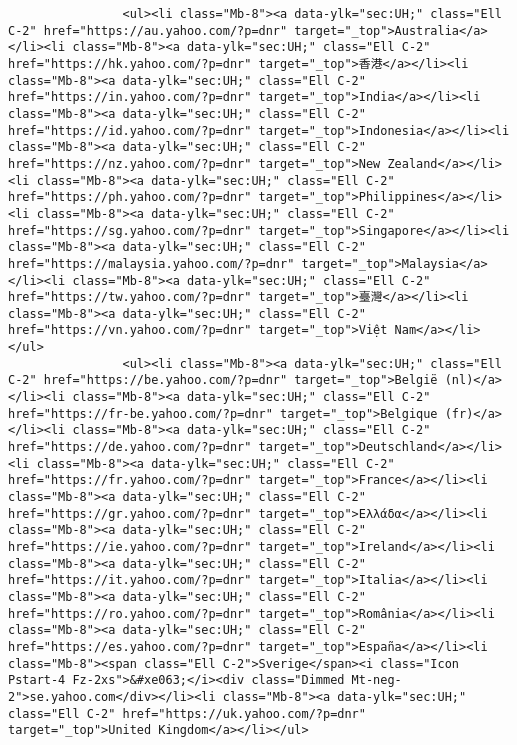 \begin{verbatim}
                <ul><li class="Mb-8"><a data-ylk="sec:UH;" class="Ell C-2" href="https://au.yahoo.com/?p=dnr" target="_top">Australia</a></li><li class="Mb-8"><a data-ylk="sec:UH;" class="Ell C-2" href="https://hk.yahoo.com/?p=dnr" target="_top">香港</a></li><li class="Mb-8"><a data-ylk="sec:UH;" class="Ell C-2" href="https://in.yahoo.com/?p=dnr" target="_top">India</a></li><li class="Mb-8"><a data-ylk="sec:UH;" class="Ell C-2" href="https://id.yahoo.com/?p=dnr" target="_top">Indonesia</a></li><li class="Mb-8"><a data-ylk="sec:UH;" class="Ell C-2" href="https://nz.yahoo.com/?p=dnr" target="_top">New Zealand</a></li><li class="Mb-8"><a data-ylk="sec:UH;" class="Ell C-2" href="https://ph.yahoo.com/?p=dnr" target="_top">Philippines</a></li><li class="Mb-8"><a data-ylk="sec:UH;" class="Ell C-2" href="https://sg.yahoo.com/?p=dnr" target="_top">Singapore</a></li><li class="Mb-8"><a data-ylk="sec:UH;" class="Ell C-2" href="https://malaysia.yahoo.com/?p=dnr" target="_top">Malaysia</a></li><li class="Mb-8"><a data-ylk="sec:UH;" class="Ell C-2" href="https://tw.yahoo.com/?p=dnr" target="_top">臺灣</a></li><li class="Mb-8"><a data-ylk="sec:UH;" class="Ell C-2" href="https://vn.yahoo.com/?p=dnr" target="_top">Việt Nam</a></li></ul>
                <ul><li class="Mb-8"><a data-ylk="sec:UH;" class="Ell C-2" href="https://be.yahoo.com/?p=dnr" target="_top">België (nl)</a></li><li class="Mb-8"><a data-ylk="sec:UH;" class="Ell C-2" href="https://fr-be.yahoo.com/?p=dnr" target="_top">Belgique (fr)</a></li><li class="Mb-8"><a data-ylk="sec:UH;" class="Ell C-2" href="https://de.yahoo.com/?p=dnr" target="_top">Deutschland</a></li><li class="Mb-8"><a data-ylk="sec:UH;" class="Ell C-2" href="https://fr.yahoo.com/?p=dnr" target="_top">France</a></li><li class="Mb-8"><a data-ylk="sec:UH;" class="Ell C-2" href="https://gr.yahoo.com/?p=dnr" target="_top">Ελλάδα</a></li><li class="Mb-8"><a data-ylk="sec:UH;" class="Ell C-2" href="https://ie.yahoo.com/?p=dnr" target="_top">Ireland</a></li><li class="Mb-8"><a data-ylk="sec:UH;" class="Ell C-2" href="https://it.yahoo.com/?p=dnr" target="_top">Italia</a></li><li class="Mb-8"><a data-ylk="sec:UH;" class="Ell C-2" href="https://ro.yahoo.com/?p=dnr" target="_top">România</a></li><li class="Mb-8"><a data-ylk="sec:UH;" class="Ell C-2" href="https://es.yahoo.com/?p=dnr" target="_top">España</a></li><li class="Mb-8"><span class="Ell C-2">Sverige</span><i class="Icon Pstart-4 Fz-2xs">&#xe063;</i><div class="Dimmed Mt-neg-2">se.yahoo.com</div></li><li class="Mb-8"><a data-ylk="sec:UH;" class="Ell C-2" href="https://uk.yahoo.com/?p=dnr" target="_top">United Kingdom</a></li></ul>

\end{verbatim}
